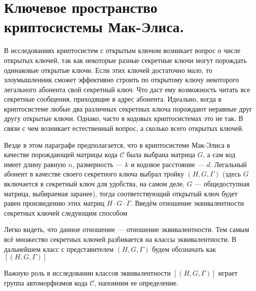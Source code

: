 
\section{Ключевое пространство криптосистемы Мак-Элиса.}
В исследованиях криптосистем с открытым ключом возникает вопрос о
числе  открытых ключей, так как некоторые разные секретные ключи
могут порождать одинаковые открытые ключи. Если этих ключей
достаточно мало, то злоумышленник сможет эффективно строить по
открытому ключу некоторого легального абонента свой секретный
ключ. Что даст ему возможность читать все секретные сообщения,
приходящие в адрес абонента. Идеально, когда в криптосистеме любые
два различных секретных ключа порождают неравные друг другу
открытые ключи. Однако, часто в кодовых криптосистемах это не так.
В связи с чем возникает естественный вопрос, а сколько всего
открытых ключей.

Везде в этом параграфе предполагается, что в криптосистеме
Мак-Элиса в качестве порождающей матрицы кода $\mathcal C$ была
выбрана матрица $G$, а сам код имеет длину равную $n$, размерность
--- $k$ и кодовое расстояние --- $d$.  Легальный абонент в
качестве своего секретного ключа выбрал тройку $(H,G,\Gamma)$
(здесь $G$ включается в секретный ключ для удобства, на самом
деле, $G$ --- общедоступная матрица, выбираемая заранее), тогда
соответствующий открытый ключ будет равен произведению этих матриц
$H\cdot G\cdot \Gamma$. Введём отношение эквивалентности секретных
ключей следующим способом 

Легко видеть, что данное отношение --- отношение эквивалентности.
Тем самым всё множество секретных ключей разбивается на классы
эквивалентности. В дальнейшем класс с представителем
$(H,G,\Gamma)$ будем обозначать как $[(H,G,\Gamma)]$

Важную роль в исследовании классов эквивалентности
$[(H,G,\Gamma)]$ играет группа автоморфизмов кода $\mathcal C$,
напомним ее определение.


